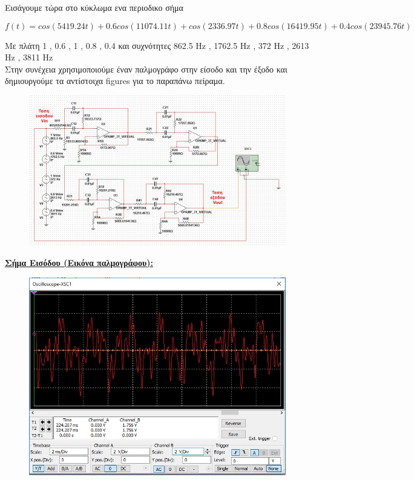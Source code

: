 \documentclass{article}
\begin{document}
{\clearpage
Εισάγουμε τώρα στο κύκλωμα ενα περιοδικο σήμα\begin{changemargin}{-2.5cm}{0.5cm}\begin{equation*}
\boxed{
f(t) = cos(5419.24t) + 0.6 cos(11074.11t) + cos(2336.97t) + 0.8cos(16419.95t) + 0.4cos(23945.76t) }
\end{equation*}
\end{changemargin}
Με πλάτη 1 , 0.6 , 1 , 0.8 , 0.4 και συχνότητες  862.5 Hz , 1762.5 Hz , 372 Hz , 2613 Hz , 3811 Hz\\
Στην συνέχεια χρησιμοποιούμε έναν παλμογράφο στην είσοδο και την έξοδο και δημιουργούμε τα αντίστοιχα figures για το παραπάνω πείραμα.
\begin{figure}[h!]
\centering
 	\advance\leftskip-4cm
  \includegraphics[width=200mm,scale=2]{thema2/multisim5.jpg}
\end{figure} 
\clearpage
\textbf{\underline{Σήμα Εισόδου (Εικόνα παλμογράφου):}}
\begin{figure}[h!]
\centering
 	\advance\leftskip-1cm
  \includegraphics[width=130mm,scale=2]{thema2/multisim6.jpg}

\end{figure}}
\end{document}
